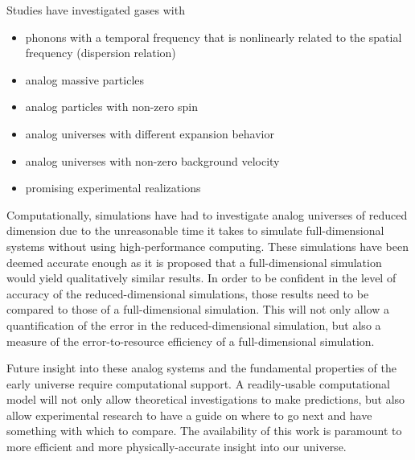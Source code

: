 \documentclass{article}
\begin{document}
    Studies have investigated gases with
    
    \begin{itemize}
        \item phonons with a temporal frequency that is nonlinearly related to the spatial frequency (dispersion relation)\cite{Nonlinear_dispersion_Lorentz_breaking_1, Nonlinear_dispersion_Lorentz_breaking_2, Nonlinear_dispersion_Lorentz_breaking_3}
        
        \item analog massive particles\cite{massive_1, massive_2, massive_3}

        \item analog particles with non-zero spin\cite{massive_and_spin_4, massive_and_spin_5, massive_and_spin_6, massive_and_spin_7}

        \item analog universes with different expansion behavior\cite{sudden_transition_1, sudden_transition_2, cyclic_cosmology, Experimental_interaction_strength_1}

        \item analog universes with non-zero background velocity\cite{background_velocity_1, background_velocity_2, background_velocity_3, background_velocity_4, background_velocity_5}

        \item promising experimental realizations \cite{Experimental_candidate_1, Experimental_candidate_2, Experimental_interaction_strength_1, Experimental_interaction_strength_2}
    \end{itemize}

    Computationally, simulations have had to investigate analog universes of reduced dimension due to the unreasonable time it takes to simulate full-dimensional systems without using high-performance computing.  These simulations have been deemed accurate enough as it is proposed that a full-dimensional simulation would yield qualitatively similar results.  In order to be confident in the level of accuracy of the reduced-dimensional simulations, those results need to be compared to those of a full-dimensional simulation.  This will not only allow a quantification of the error in the reduced-dimensional simulation, but also a measure of the error-to-resource efficiency of a full-dimensional simulation.

    Future insight into these analog systems and the fundamental properties of the early universe require computational support.  A readily-usable computational model will not only allow theoretical investigations to make predictions, but also allow experimental research to have a guide on where to go next and have something with which to compare.  The availability of this work is paramount to more efficient and more physically-accurate insight into our universe.
        
\end{document}
